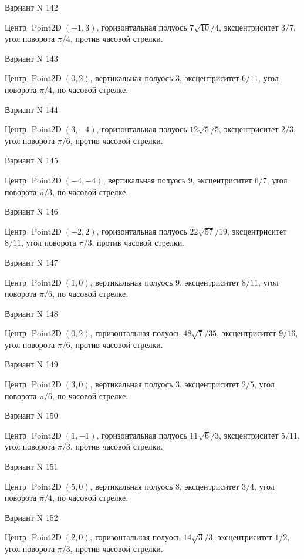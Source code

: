 \documentclass[11pt]{report}
\begin{document}
Вариант N 142

Центр $\operatorname{Point2D}\left(-1, 3\right)$, горизонтальная полуось $7 \sqrt{10} / 4$, эксцентриситет $3 / 7$, угол поворота $\pi / 4$, против часовой стрелки.

Вариант N 143

Центр $\operatorname{Point2D}\left(0, 2\right)$, вертикальная полуось $3$, эксцентриситет $6 / 11$, угол поворота $\pi / 4$, по часовой стрелке.

Вариант N 144

Центр $\operatorname{Point2D}\left(3, -4\right)$, горизонтальная полуось $12 \sqrt{5} / 5$, эксцентриситет $2 / 3$, угол поворота $\pi / 6$, против часовой стрелки.

Вариант N 145

Центр $\operatorname{Point2D}\left(-4, -4\right)$, вертикальная полуось $9$, эксцентриситет $6 / 7$, угол поворота $\pi / 3$, по часовой стрелке.

Вариант N 146

Центр $\operatorname{Point2D}\left(-2, 2\right)$, горизонтальная полуось $22 \sqrt{57} / 19$, эксцентриситет $8 / 11$, угол поворота $\pi / 3$, против часовой стрелки.

Вариант N 147

Центр $\operatorname{Point2D}\left(1, 0\right)$, вертикальная полуось $9$, эксцентриситет $8 / 11$, угол поворота $\pi / 6$, по часовой стрелке.

Вариант N 148

Центр $\operatorname{Point2D}\left(0, 2\right)$, горизонтальная полуось $48 \sqrt{7} / 35$, эксцентриситет $9 / 16$, угол поворота $\pi / 6$, против часовой стрелки.

Вариант N 149

Центр $\operatorname{Point2D}\left(3, 0\right)$, вертикальная полуось $3$, эксцентриситет $2 / 5$, угол поворота $\pi / 6$, по часовой стрелке.

Вариант N 150

Центр $\operatorname{Point2D}\left(1, -1\right)$, горизонтальная полуось $11 \sqrt{6} / 3$, эксцентриситет $5 / 11$, угол поворота $\pi / 3$, против часовой стрелки.

Вариант N 151

Центр $\operatorname{Point2D}\left(5, 0\right)$, вертикальная полуось $8$, эксцентриситет $3 / 4$, угол поворота $\pi / 4$, по часовой стрелке.

Вариант N 152

Центр $\operatorname{Point2D}\left(2, 0\right)$, горизонтальная полуось $14 \sqrt{3} / 3$, эксцентриситет $1 / 2$, угол поворота $\pi / 3$, против часовой стрелки.
\end{document}
